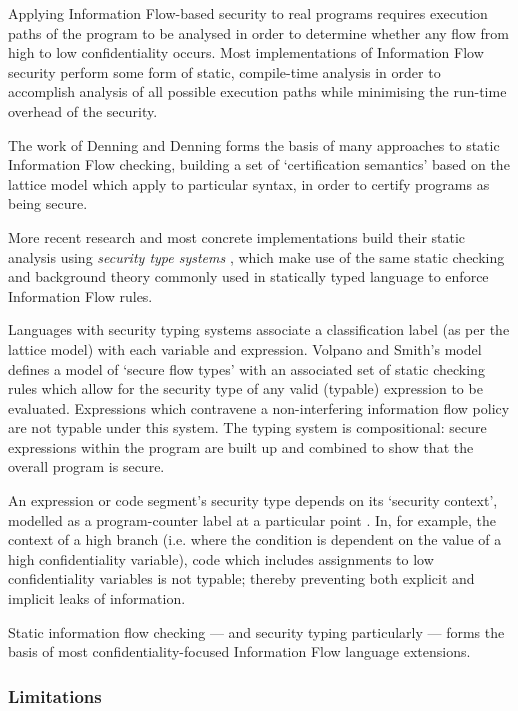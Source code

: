Applying Information Flow-based security to real programs requires execution paths of the program to be analysed in order to determine whether any flow from high to low confidentiality occurs. Most implementations of Information Flow security perform some form of static, compile-time analysis in order to accomplish analysis of all possible execution paths while minimising the run-time overhead of the security.

The work of Denning and Denning \cite{denning1977if} forms the basis of many approaches to static Information Flow checking, building a set of `certification semantics' based on the lattice model which apply to particular syntax, in order to certify programs as being secure.

More recent research and most concrete implementations build their static analysis using \textit{security type systems} \cite{sabelfeld2003if}, which make use of the same static checking and background theory commonly used in statically typed language to enforce Information Flow rules.

Languages with security typing systems associate a classification label (as per the lattice model) with each variable and expression. Volpano and Smith's model \cite{volpano1996sectype} defines a model of `secure flow types' with an associated set of static checking rules which allow for the security type of any valid (typable) expression to be evaluated. Expressions which contravene a non-interfering information flow policy are not typable under this system. The typing system is compositional: secure expressions within the program are built up and combined to show that the overall program is secure.

An expression or code segment's security type depends on its `security context', modelled as a program-counter label at a particular point \cite{sabelfeld2003if}. In, for example, the context of a high branch (i.e. where the condition is dependent on the value of a high confidentiality variable), code which includes assignments to low confidentiality variables is not typable; thereby preventing both explicit and implicit leaks of information.

Static information flow checking --- and security typing particularly --- forms the basis of most confidentiality-focused Information Flow language extensions.

\subsubsection{Limitations}

